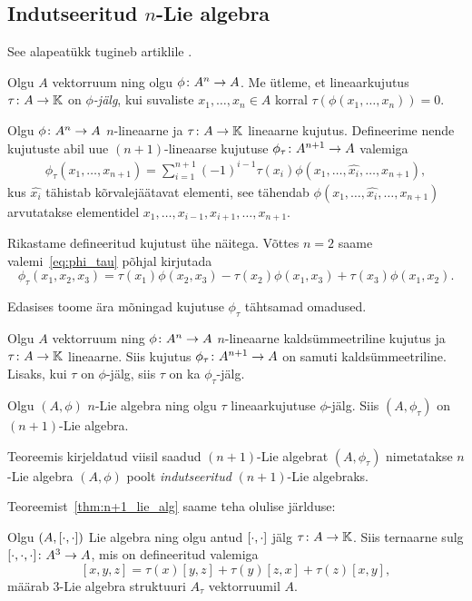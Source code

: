 \subsection{Indutseeritud \texorpdfstring{$n$}\ -Lie algebra}

See alapeatükk tugineb artiklile \cite{AKMS:2014}.

\begin{dfn}[Jälg]
    Olgu $A$ vektorruum ning olgu $\phi \colon A^n \to A$. Me
    ütleme, et lineaarkujutus $\tau \colon A \to \mathbb{K}$ on
    \emph{$\phi$-jälg}, kui suvaliste $x_1, \dots, x_n \in A$
    korral $\tau \left(
        \phi \left( x_1, \dots, x_n \right)
    \right) = 0$.
\end{dfn}

Olgu $\phi \colon A^n \to A$ $n$-lineaarne ja
$\tau \colon A \to \mathbb{K}$ lineaarne kujutus. Defineerime nende
kujutuste abil uue $(n+1)$-lineaarse kujutuse
$\phi_\tau \colon A^{n+1} \to A$ valemiga
\begin{align}\label{eq:phi_tau}
    \phi_\tau \left( x_1, \dots, x_{n+1} \right) =
    \sum_{i=1}^{n+1} (-1)^{i-1} \tau(x_i)
        \phi(x_1, \dots, \hat{x_i}, \dots, x_{n+1}),
\end{align}
kus $\hat{x_i}$ tähistab kõrvalejäätavat elementi, see tähendab
$\phi(x_1, \dots, \hat{x_i}, \dots, x_{n+1})$ arvutatakse elementidel
$x_1, \dots, x_{i-1}, x_{i+1}, \dots, x_{n+1}$.

Rikastame defineeritud kujutust ühe näitega. Võttes $n = 2$ saame
valemi~\ref{eq:phi_tau} põhjal kirjutada
\[
    \phi_\tau (x_1, x_2, x_3) =
        \tau(x_1) \phi(x_2, x_3) -
        \tau(x_2) \phi(x_1, x_3) +
        \tau(x_3) \phi(x_1, x_2).
\]

Edasises toome ära mõningad kujutuse $\phi_\tau$ tähtsamad omadused.

\begin{lemma}
    Olgu $A$ vektorruum ning $\phi \colon A^n \to A$ $n$-lineaarne kaldsümmeetriline kujutus
    ja $\tau \colon A \to \mathbb{K}$ lineaarne. Siis kujutus
    $\phi_\tau \colon A^{n+1} \to A$ on samuti kaldsümmeetriline. Lisaks,
    kui $\tau$ on $\phi$-jälg, siis $\tau$ on ka $\phi_\tau$-jälg.
\end{lemma}

\begin{thm}\label{thm:n+1_lie_alg}
    Olgu $(A, \phi)$ $n$-Lie algebra ning olgu $\tau$ lineaarkujutuse
    $\phi$-jälg. Siis $(A, \phi_\tau)$ on $(n+1)$-Lie algebra.
\end{thm}

Teoreemis kirjeldatud viisil saadud $(n+1)$-Lie algebrat $(A, \phi_\tau)$
nimetatakse $n$-Lie algebra $(A, \phi)$ poolt \emph{indutseeritud}
$(n+1)$-Lie algebraks.

Teoreemist~\ref{thm:n+1_lie_alg} saame teha olulise järlduse:

\begin{jar}
    Olgu $(A, \left[ \cdot, \cdot \right])$ Lie algebra ning olgu antud
    $\left[ \cdot, \cdot \right]$ jälg $\tau \colon A \to \mathbb{K}$. Siis ternaarne sulg
    $[ \cdot, \cdot, \cdot ] \colon A^3 \to A$, mis on defineeritud
    valemiga
    \[
        [x, y, z] = \tau(x)[y, z] + \tau(y)[z, x] + \tau(z)[x, y],
    \]
    määrab $3$-Lie algebra struktuuri $A_\tau$ vektorruumil $A$.
\end{jar}
